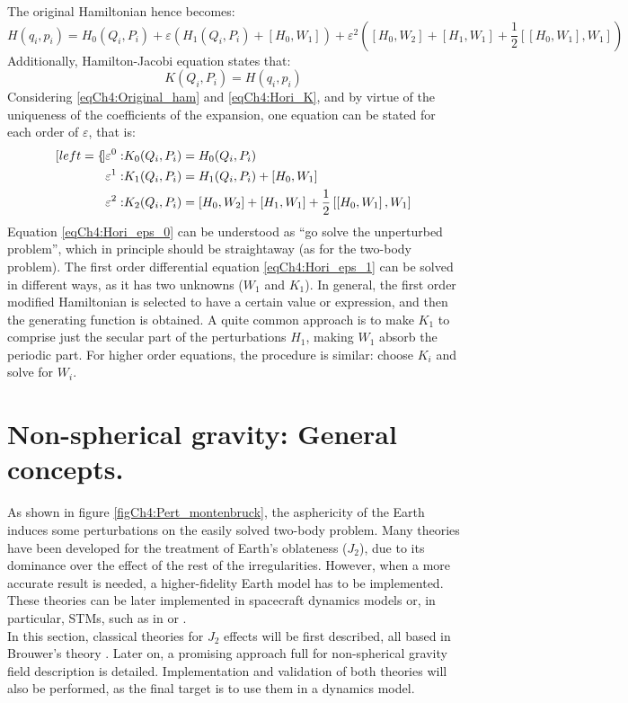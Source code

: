 		\indent The original Hamiltonian hence becomes:
		\begin{equation}
		H(q_i, p_i) = H_0(Q_i, P_i) + \varepsilon \left( H_1(Q_i, P_i) + \left[ H_0, W_1 \right]\right) + \varepsilon^2 \left(  \left[ H_0, W_2 \right] + \left[ H_1, W_1 \right] + \dfrac{1}{2}\left[ \left[ H_0, W_1 \right], W_1 \right]\right)
		\label{eqCh4:Original_ham}
		\end{equation}
		\indent Additionally, Hamilton-Jacobi equation states that:
		\[
		K(Q_i, P_i) = H(q_i, p_i)
		\]
		\indent Considering \eqref{eqCh4:Original_ham} and \eqref{eqCh4:Hori_K}, and by virtue of the uniqueness of the coefficients of the expansion, one equation can be stated for each order of $\varepsilon$, that is:
		\begin{alignat}{4}[left = \empheqlbrace]
		\label{eqCh4:Hori_eps_0}\varepsilon^0 : & K_0(Q_i, P_i) = H_0(Q_i, P_i) \\
		\label{eqCh4:Hori_eps_1}\varepsilon^1 : & K_1(Q_i, P_i) = H_1(Q_i, P_i) + \left[ H_0, W_1 \right] \\
		\label{eqCh4:Hori_eps_2}\varepsilon^2 : & K_2(Q_i, P_i) = \left[ H_0, W_2 \right] + \left[ H_1, W_1 \right] + \dfrac{1}{2} \left[ \left[ H_0, W_1 \right], W_1\right]
		\end{alignat}
		\indent Equation \eqref{eqCh4:Hori_eps_0} can be understood as ``go solve the unperturbed problem'', which in principle should be straightaway (as for the two-body problem). The first order differential equation \eqref{eqCh4:Hori_eps_1} can be solved in different ways, as it has two unknowns ($W_1$ and $K_1$). In general, the first order modified Hamiltonian is selected to have a certain value or expression, and then the generating function is obtained. A quite common approach is to make $K_1$ to comprise just the secular part of the perturbations $H_1$, making $W_1$ absorb the periodic part. For higher order equations, the procedure is similar: choose $K_i$ and solve for $W_i$.
\section{Non-spherical gravity: General concepts.}
%
\indent As shown in figure \ref{figCh4:Pert_montenbruck}, the asphericity of the Earth induces some perturbations on the easily solved two-body problem. Many theories have been developed for the treatment of Earth's oblateness ($J_2$), due to its dominance over the effect of the rest of the irregularities. However, when a more accurate result is needed, a higher-fidelity Earth model has to be implemented. These theories can be later implemented in spacecraft dynamics models or, in particular, STMs, such as in \cite{GA_STM} or \cite{Chihabi}. \\
%
\indent In this section, classical theories for $J_2$ effects will be first described, all based in Brouwer's theory \cite{Brouwer_paper}. Later on, a promising approach full for non-spherical gravity field description is detailed. Implementation and validation of both theories will also be performed, as the final target is to use them in a dynamics model.
%
